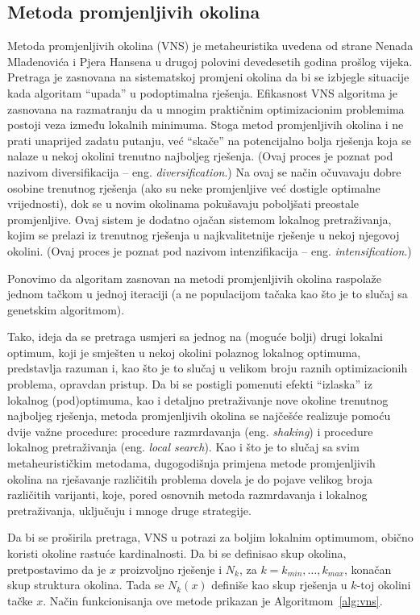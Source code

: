 \documentclass[a4paper, utf8, 11pt, colorlinks]{book}
\theoremstyle{definition}
\begin{document}
\subsection{Metoda promjenljivih okolina}\label{intro:vns}
Metoda promjenljivih okolina (VNS) je metaheuristika uvedena od strane Nenada Mladenovića i Pjera Hansena u drugoj polovini devedesetih godina prošlog vijeka.
Pretraga je zasnovana na sistematskoj promjeni okolina da bi se izbjegle situacije kada algoritam ``upada'' u podoptimalna rješenja. Efikasnost VNS algoritma je zasnovana na razmatranju da u mnogim praktičnim optimizacionim problemima postoji veza između lokalnih minimuma. Stoga metod promjenljivih okolina i ne prati unaprijed zadatu putanju, već ``skače'' na potencijalno bolja rješenja koja se nalaze u nekoj okolini trenutno najboljeg rješenja. (Ovaj proces je poznat pod nazivom diversifikacija -- eng. \emph{diversification}.)
Na ovaj se način očuvavaju dobre osobine trenutnog rješenja (ako su neke promjenljive već dostigle optimalne vrijednosti), dok se u novim okolinama pokušavaju poboljšati preostale promjenljive. Ovaj sistem je dodatno ojačan sistemom lokalnog pretraživanja, kojim se prelazi iz trenutnog rješenja u najkvalitetnije rješenje u nekoj njegovoj okolini. (Ovaj proces je poznat pod nazivom intenzifikacija -- eng. \emph{intensification}.)

Ponovimo da algoritam zasnovan na metodi promjenljivih okolina raspolaže jednom tačkom u jednoj iteraciji (a ne populacijom tačaka kao što je to slučaj sa genetskim algoritmom).

Tako, ideja da se pretraga usmjeri sa jednog na (moguće bolji) drugi lokalni optimum, koji je smješten u nekoj okolini polaznog lokalnog optimuma, predstavlja razuman  i, kao što je to slučaj u velikom broju raznih optimizacionih problema, opravdan pristup.
Da bi se postigli pomenuti efekti ``izlaska'' iz lokalnog (pod)optimuma, kao i detaljno pretraživanje nove okoline trenutnog najboljeg rješenja, metoda promjenljivih okolina se najčešće realizuje pomoću dvije važne procedure: procedure razmrdavanja (eng. \emph{shaking}) i procedure lokalnog pretraživanja (eng. \emph{local search}). Kao i što je to slučaj sa svim metaheurističkim metodama, dugogodišnja primjena metode promjenljivih okolina na rješavanje različitih problema dovela je do pojave velikog broja različitih varijanti, koje, pored osnovnih metoda razmrdavanja i lokalnog pretraživanja, uključuju i mnoge druge strategije.

Da bi se proširila pretraga,  VNS u potrazi za boljim lokalnim optimumom, obično koristi okoline rastuće kardinalnosti. Da bi se definisao skup okolina, pretpostavimo da je $x$ proizvoljno rješenje i $N_k$, za $k=k_{min},\ldots,k_{max}$, konačan skup struktura okolina. Tada se  $N_k(x)$ definiše kao skup rješenja u $k$-toj okolini tačke $x$. 
Način funkcionisanja ove metode prikazan je Algoritmom~\ref{alg:vns}. 
\end{document}
